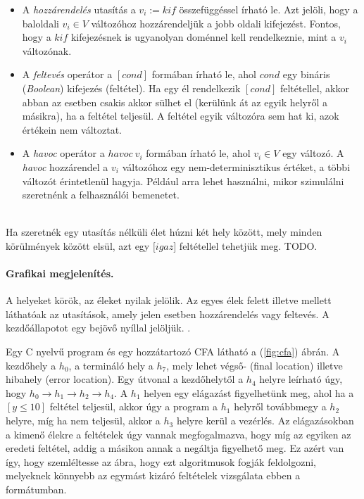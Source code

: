 \begin{itemize}
	\item A \emph{hozzárendelés} utasítás a $v_i := \mathit{kif}$ összefüggéssel írható le. Azt jelöli, hogy a baloldali $v_i \in V$ változóhoz hozzárendeljük a jobb oldali kifejezést. Fontos, hogy a $\mathit{kif}$ kifejezésnek is ugyanolyan doménnel kell rendelkeznie, mint a $v_i$ változónak.
	
	\item A \emph{feltevés} operátor a $[\mathit{cond}]$ formában írható le, ahol $\mathit{cond}$ egy bináris (\emph{Boolean}) kifejezés (feltétel). Ha egy él rendelkezik $\mathit{[cond]}$ feltétellel, akkor abban az esetben csakis akkor sülhet el (kerülünk át az egyik helyről a másikra), ha a feltétel teljesül. A feltétel egyik változóra sem hat ki, azok értékein nem változtat.
	
	\item A \emph{havoc} operátor a $\mathit{havoc}~v_i$ formában írható le, ahol $v_i \in V$ egy változó. A \emph{havoc} hozzárendel a $v_i$ változóhoz egy nem-determinisztikus értéket, a többi változót érintetlenül hagyja. Például arra lehet használni, mikor szimulálni szeretnénk a felhasználói bemenetet.
\end{itemize}
\ \\
Ha szeretnék egy utasítás nélküli élet húzni két hely között, mely minden körülmények között elsül, azt egy $[\mathit{igaz]}$ feltétellel tehetjük meg. TODO.

\paragraph{Grafikai megjelenítés.}
A helyeket körök, az éleket nyilak jelölik. Az egyes élek felett illetve mellett láthatóak az utasítások, amely jelen esetben hozzárendelés vagy feltevés. A kezdőállapotot egy bejövő nyíllal jelöljük. \cite{soft_ver_akos}.

\begin{example}
	Egy C nyelvű program és egy hozzátartozó CFA látható a (\ref{fig:cfa}) ábrán. A kezdőhely a $h_0$, a termináló hely a $h_7$, mely lehet végső- (final location) illetve hibahely (error location). Egy útvonal a kezdőhelytől a $h_4$ helyre leírható úgy, hogy $h_0 \rightarrow h_1 \rightarrow h_2 \rightarrow h_4$. A $h_1$ helyen egy elágazást figyelhetünk meg, ahol ha a $[y \leq 10]$ feltétel teljesül, akkor úgy a program a $h_1$ helyről továbbmegy a $h_2$ helyre, míg ha nem teljesül, akkor a $h_3$ helyre kerül a vezérlés. Az elágazásokban a kimenő élekre a feltételek úgy vannak megfogalmazva, hogy míg az egyiken az eredeti feltétel, addig a másikon annak a negáltja figyelhető meg. Ez azért van így, hogy szemléltesse az ábra, hogy ezt algoritmusok fogják feldolgozni, melyeknek könnyebb az egymást kizáró feltételek vizsgálata ebben a formátumban.
\end{example}

